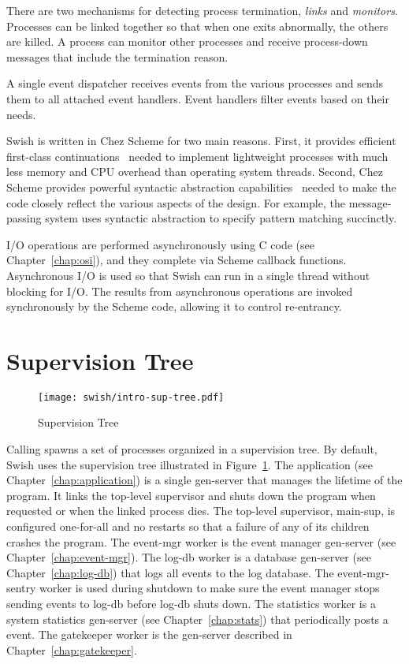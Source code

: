 There are two mechanisms for detecting process termination,
\emph{links} and \emph{monitors}. Processes can be linked together so
that when one exits abnormally, the others are killed. A process can
monitor other processes and receive process-down messages that include
the termination reason.

A single event dispatcher receives events from the various processes
and sends them to all attached event handlers.  Event handlers filter
events based on their needs.

Swish is written in Chez Scheme
for two main reasons. First, it provides efficient first-class
continuations~\cite{one-shot,representing-control} needed to implement
lightweight processes with much less memory and CPU overhead than
operating system threads.  Second, Chez Scheme provides powerful
syntactic abstraction capabilities~\cite{syntactic-abstraction} needed
to make the code closely reflect the various aspects of the
design. For example, the message-passing system uses syntactic
abstraction to specify pattern matching succinctly.

I/O operations are performed asynchronously using C code (see
Chapter~\ref{chap:osi}), and they complete via Scheme callback
functions. Asynchronous I/O is used so that Swish can run in a single
thread without blocking for I/O. The results from asynchronous
operations are invoked synchronously by the Scheme code, allowing it
to control re-entrancy.

\section {Supervision Tree}\label{sec:default-supervision-tree}

\begin{figure}
  \center\texttt{[image: swish/intro-sup-tree.pdf]}
  \caption{\label{fig:intro-sup-tree}Supervision Tree}
\end{figure}

Calling  spawns a set of processes
organized in a supervision tree.
By default, Swish uses the supervision tree illustrated in
Figure~\ref{fig:intro-sup-tree}.
The application (see Chapter~\ref{chap:application}) is a single gen-server
that manages the lifetime of the program.
It links the top-level supervisor and shuts down the program when
requested or when the linked process dies.
The top-level supervisor, main-sup,
is configured one-for-all and no restarts so that a failure of any of
its children crashes the program. The event-mgr worker is the event
manager gen-server (see Chapter~\ref{chap:event-mgr}). The log-db
worker is a database gen-server (see Chapter~\ref{chap:log-db}) that
logs all events to the log database. The event-mgr-sentry worker is
used during shutdown to make sure the event manager stops sending
events to log-db before log-db shuts down. The statistics worker is a
system statistics gen-server (see Chapter~\ref{chap:stats}) that
periodically posts a  event.  The gatekeeper
worker is the gen-server described in Chapter~\ref{chap:gatekeeper}.

